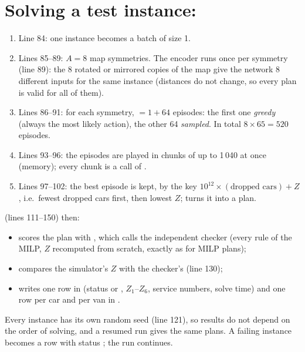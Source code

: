 \section{Solving a test instance: }
\label{sec:solve}


\begin{enumerate}
  \item Line 84: one instance becomes a batch of size 1.
  \item Lines 85--89: $A=8$ map symmetries. The encoder runs once per symmetry (line 89): the 8 rotated or mirrored copies of the map give the network 8 different inputs for the same instance (distances do not change, so every plan is valid for all of them).
  \item Lines 86--91: for each symmetry,  $=1+64$ episodes: the first one \emph{greedy} (always the most likely action), the other 64 \emph{sampled}. In total $8\times65=520$ episodes.
  \item Lines 93--96: the episodes are played in chunks of up to 1\,040 at once (memory); every chunk is a call of .
  \item Lines 97--102: the best episode is kept, by the key $10^{12}\times(\text{dropped cars})+Z$, i.e.\ fewest dropped cars first, then lowest $Z$;  turns it into a plan.
\end{enumerate}

 (lines 111--150) then:
\begin{itemize}
  \item scores the plan with , which calls the independent checker  (every rule of the MILP, $Z$ recomputed from scratch, exactly as for MILP plans);
  \item compares the simulator's $Z$ with the checker's (line 130);
  \item writes one row in  (status  or , $Z_1$--$Z_6$, service numbers, solve time) and one row per car and per van in .
\end{itemize}
Every instance has its own random seed (line 121), so results do not depend on the order of solving, and a resumed run gives the same plans. A failing instance becomes a row with status ; the run continues.

